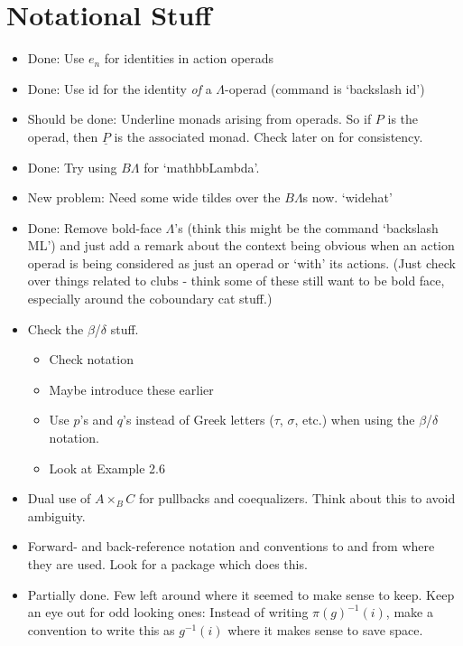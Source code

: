 \documentclass{amsart}
\begin{document}
\section*{Notational Stuff}
\begin{itemize}
	\item Done: Use $e_n$ for identities in action operads
	\item Done: Use $\mbox{id}$ for the identity \emph{of} a $\Lambda$-operad (command is `backslash id')
	\item Should be done: Underline monads arising from operads. So if $P$ is the operad, then $\underline{P}$ is the associated monad. Check later on for consistency.
	\item Done: Try using $B\Lambda$ for `mathbb{Lambda}'.
	\item New problem: Need some wide tildes over the $B\Lambda$s now. `widehat'
	\item Done: Remove bold-face $\Lambda$'s (think this might be the command `backslash ML') and just add a remark about the context being obvious when an action operad is being considered as just an operad or `with' its actions. (Just check over things related to clubs - think some of these still want to be bold face, especially around the coboundary cat stuff.) 
	\item Check the $\beta$/$\delta$ stuff.
		\begin{itemize}
			\item Check notation
			\item Maybe introduce these earlier
			\item Use $p$'s and $q$'s instead of Greek letters ($\tau$, $\sigma$, etc.) when using the $\beta$/$\delta$ notation.
			\item Look at Example 2.6
		\end{itemize}
	\item Dual use of $A \times_B C$ for pullbacks and coequalizers. Think about this to avoid ambiguity.
	\item Forward- and back-reference notation and conventions to and from where they are used. Look for a package which does this.
	\item Partially done. Few left around where it seemed to make sense to keep. Keep an eye out for odd looking ones: Instead of writing $\pi(g)^{-1}(i)$, make a convention to write this as $g^{-1}(i)$ where it makes sense to save space.
\end{itemize}
\end{document}
